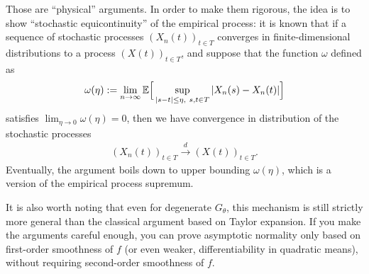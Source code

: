 \documentclass[11pt,letterpaper]{article}
\numberwithin{theorem}{lecture}
\numberwithin{proposition}{lecture}
\numberwithin{lemma}{lecture}
\numberwithin{claim}{lecture}
\numberwithin{corollary}{lecture}
\numberwithin{definition}{lecture}
\numberwithin{conjecture}{lecture}
\numberwithin{remark}{lecture}
\numberwithin{example}{lecture}
\numberwithin{equation}{lecture}
\begin{document}
Those are ``physical'' arguments. In order to make them rigorous, the idea is to show ``stochastic equicontinuity'' of the empirical process: it is known that if a sequence of stochastic processes $(X_n (t))_{t \in T}$ converges in finite-dimensional distributions to a process $(X(t))_{t \in T}$, and suppose that the function $\omega$ defined as
\begin{align*}
 \omega (\eta) := \lim_{n \rightarrow \infty} {\mathbb{E}} \Big[ \sup_{|s - t| \leq \eta,~ s, t \in T} |X_n (s) - X_n (t)| \Big]
\end{align*}
satisfies $\lim_{\eta \to 0} \omega (\eta) = 0$, then we have convergence in distribution of the stochastic processes
\begin{align*}
  (X_n (t))_{t \in T} \overset{d}{\to} (X(t))_{t \in T}.
\end{align*}
Eventually, the argument boils down to upper bounding $\omega(\eta)$, which is a version of the empirical process supremum.

It is also worth noting that even for degenerate $G_\theta$, this mechanism is still strictly more general than the classical argument based on Taylor expansion. If you make the arguments careful enough, you can prove asymptotic normality only based on first-order smoothness of $f$ (or even weaker, differentiability in quadratic means), without requiring second-order smoothness of $f$.
\end{document}
